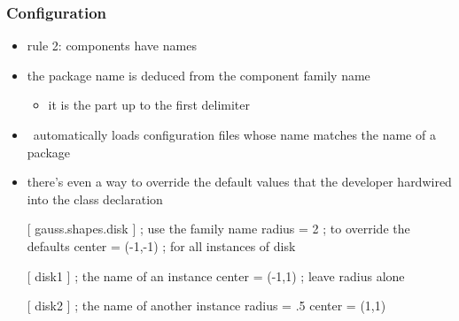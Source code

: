\begin{frame}[fragile]
%
  \frametitle{Configuration}
%
  \begin{itemize}
  \item rule 2: components have names
  \item the package name is deduced from the component family name
    \begin{itemize}
    \item it is the part up to the first delimiter
    \end{itemize}
  \item \pyre\ automatically loads configuration files whose name matches the name of a package
  \item there's even a way to override the default values that the developer hardwired into
    the class declaration
%
    \begin{icfg}{}
    [ gauss.shapes.disk ]         ; use the family name
    radius = 2                    ; to override the defaults
    center = (-1,-1)              ; for all instances of disk

    [ disk1 ]                     ; the name of an instance
    center = (-1,1)               ; leave {radius} alone

    [ disk2 ]                     ; the name of another instance
    radius = .5
    center = (1,1)
    \end{icfg}
%
  \end{itemize}
%
\end{frame}

